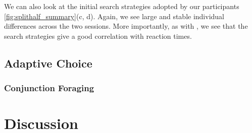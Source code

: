 \documentclass[]{rsos}%
\begin{document}
We can also look at the initial search strategies adopted by our participants \ref{fig:splithalf_summary}(c, d). Again, we see large and stable individual differences across the two sessions. More importantly, as with \cite{nowakowsak2017}, we see that the search strategies give a good correlation with reaction times. 


\subsection{Adaptive Choice}

\subsubsection{Conjunction Foraging}


\section{Discussion}





\end{document}
